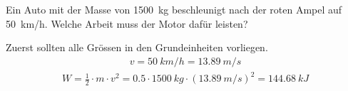 
\begin{aufgabe}
	Ein Auto mit der Masse von \SI{1500}{kg} beschleunigt nach der roten Ampel auf \SI{50}{km/h}.
	Welche Arbeit muss der Motor dafür leisten?

	
	\begin{loesung}
		Zuerst sollten alle Grössen in den Grundeinheiten vorliegen.
		\begin{eqnarray*}
			v=\SI{50}{km/h}=\SI{13.89}{m/s}
		\end{eqnarray*}
		\begin{eqnarray*}
			W=\frac{1}{2}\cdot m\cdot v^2=\num{0.5}\cdot\SI{1500}{kg}\cdot(\SI{13.89}{m/s})^2=\SI{144.68}{kJ}
		\end{eqnarray*}
	\end{loesung}
\end{aufgabe}
